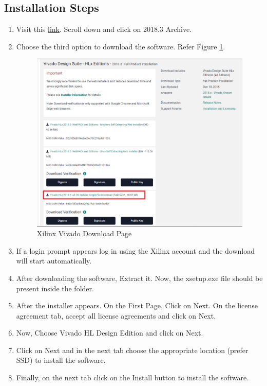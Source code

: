 \documentclass[a4paper,12pt,oneside]{book}
\begin{document}
\subsection*{Installation Steps}
\begin{enumerate}
    \item Visit this \href{ https://www.xilinx.com/support/download/index.html/content/xilinx/en/downloadNav/vivado-design-tools/archive.html}{link}. Scroll down and click on 2018.3 Archive.
    \item Choose the third option to download the software. Refer Figure \ref{figure:HLx}.
        \begin{figure}[h!]
            \centering
            \includegraphics[scale=0.5]{images/HLx_download.png}
            \caption{Xilinx Vivado Download Page}
            \label{figure:HLx}
        \end{figure}
    \item If a login prompt appears log in using the Xilinx account and the download will start automatically.
    \item After downloading the software, Extract it. Now, the xsetup.exe file should be present inside the folder.
    \item After the installer appears. On the First Page, Click on Next. On the license agreement tab, accept all license agreements and click on Next.
    \item Now, Choose Vivado HL Design Edition and click on Next.
    \item Click on Next and in the next tab choose the appropriate location (prefer SSD) to install the software.
    \item Finally, on the next tab click on the Install button to install the software.
\end{enumerate}
\end{document}
